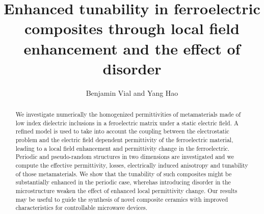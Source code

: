 \documentclass[%
 aip,
 amsmath,amssymb,
 reprint,%
linenumbers
]{revtex4-1}
\newcommand{\co}[1]{\textcolor{correction}{#1}}
\begin{document}
\title{\co{Enhanced tunability in ferroelectric composites through local field enhancement and the effect of disorder}}
\author{Benjamin Vial and Yang Hao}


%
%


%


\begin{abstract}
 We investigate \co{numerically} the homogenized permittivities of metamaterials made of low index dielectric inclusions in a feroelectric matrix under
 a static electric field. A refined model is used to take into account the coupling
 between the electrostatic problem and the electric field dependent permittivity of the
 ferroelectric material, leading to a local field enhancement and permittivity change in the ferroelectric.
 Periodic and pseudo-random structures in two dimensions are investigated and
 we \co{compute} the effective permittivity, losses, electrically induced anisotropy and tunability
 of those metamaterials. We show that the tunability of such composites might be substantially
 enhanced in the periodic case, wherehas introducing disorder in the microstructure
 weaken the effect of enhanced local permittivity change. Our results may be useful to guide the synthesis of novel composite ceramics with improved characteristics for controllable microwave devices.
\end{abstract}

\maketitle
\end{document}
